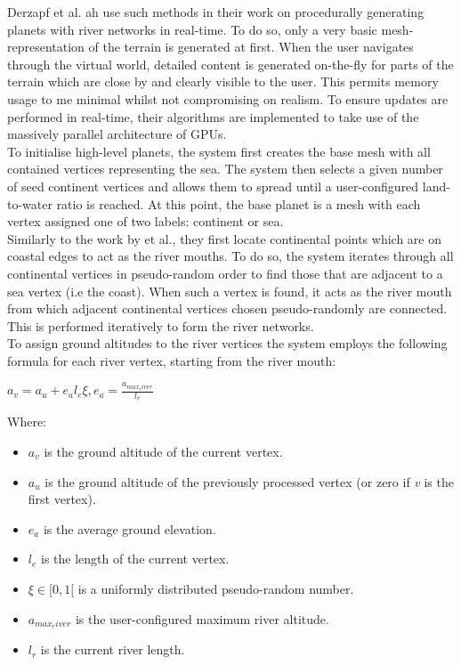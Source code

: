 Derzapf et al. \cite{Derzapf2011}ah use such methods in their work on procedurally generating planets with river networks in real-time. To do so, only a very basic mesh-representation of the terrain is generated at first. When the user navigates through the virtual world, detailed content is generated on-the-fly for parts of the terrain which are close by and clearly visible to the user. This permits memory usage to me minimal whilst not compromising on realism. To ensure updates are performed in real-time, their algorithms are implemented to take use of the massively parallel architecture of GPUs. \\
To initialise high-level planets, the system first creates the base mesh with all contained vertices representing the sea. The system then selects a given number of seed continent vertices and allows them to spread until a user-configured land-to-water ratio is reached. At this point, the base planet is a mesh with each vertex assigned one of two labels: continent or sea.\\
Similarly to the work by \cite{Genevaux2013} et al., they first locate continental points which are on coastal edges to act as the river mouths. To do so, the system iterates through all continental vertices in pseudo-random order to find those that are adjacent to a sea vertex (i.e the coast). When such a vertex is found, it acts as the river mouth from which adjacent continental vertices chosen pseudo-randomly are connected. This is performed iteratively to form the river networks.\\
To assign ground altitudes to the river vertices the system employs the following formula for each river vertex, starting from the river mouth:

$a_{v} = a_{u} + e_{a}l_{e}\xi , e_{a} = \frac{a_{max_river}}{l_{r}} $

Where:
\begin{itemize}
\item $a_{v}$ is the ground altitude of the current vertex.
\item $a_{u}$ is the ground altitude of the previously processed vertex (or zero if \textit{v} is the first vertex).
\item $e_{a}$ is the average ground elevation.
\item $l_{e}$ is the length of the current vertex.
\item $\xi \in [0,1[$ is a uniformly distributed pseudo-random number.
\item $a_{max_river}$ is the user-configured maximum river altitude.
\item $l_{r}$ is the current river length.
\end{itemize}

